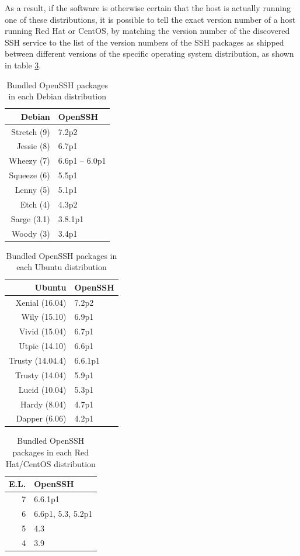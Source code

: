 \documentclass[a4paper,12pt]{article}
\begin{document}
	As a result, if the software is otherwise certain that the host is actually running one of these distributions, it is possible to tell the exact version number of a host running Red Hat or CentOS, by matching the version number of the discovered SSH service to the list of the version numbers of the SSH packages as shipped between different versions of the specific operating system distribution, as shown in table \ref{elsshvers}.
	
	\begin{table}[H]
		\centering
		\begin{tabular}{|rl|}
			\hline
			\textbf{Debian} & \textbf{OpenSSH} \\ \hline
			Stretch (9) & 7.2p2 \\
			Jessie (8) & 6.7p1 \\
			Wheezy (7) & 6.6p1 -- 6.0p1 \\
			Squeeze (6) & 5.5p1 \\
			Lenny (5) & 5.1p1 \\
			Etch (4) & 4.3p2 \\
			Sarge (3.1) & 3.8.1p1 \\
			Woody (3) & 3.4p1 \\ \hline
		\end{tabular}
		\caption{Bundled OpenSSH packages in each Debian distribution}
		\label{debsshvers}
	\end{table}
		
	\begin{table}[H]
		\centering
		\begin{tabular}{|rl|}
			\hline
			\textbf{Ubuntu} & \textbf{OpenSSH} \\ \hline
			Xenial (16.04) & 7.2p2 \\
			Wily (15.10) & 6.9p1 \\
			Vivid (15.04) & 6.7p1 \\
			Utpic (14.10) & 6.6p1 \\
			Trusty (14.04.4) & 6.6.1p1 \\
			Trusty (14.04) & 5.9p1 \\
			Lucid (10.04) & 5.3p1 \\
			Hardy (8.04) & 4.7p1 \\
			Dapper (6.06) & 4.2p1 \\ \hline
		\end{tabular}
		\caption{Bundled OpenSSH packages in each Ubuntu distribution}
		\label{ubnsshvers}
	\end{table}
			
	\begin{table}[H]
		\centering
		\begin{tabular}{|rl|}
			\hline
			\textbf{E.L.} & \textbf{OpenSSH} \\ \hline
			7 & 6.6.1p1 \\
			6 & 6.6p1, 5.3, 5.2p1 \\
			5 & 4.3 \\
			4 & 3.9 \\ \hline
		\end{tabular}
		\caption{Bundled OpenSSH packages in each Red Hat/CentOS distribution}
		\label{elsshvers}
	\end{table}
	
\end{document}
